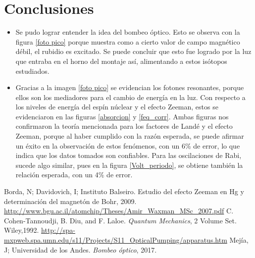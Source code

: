 \documentclass[%
 reprint,
 amsmath,amssymb,
 aps,
]{revtex4-1}
\begin{document}
\section{Conclusiones}
\begin{itemize}
    \item Se pudo lograr entender la idea del bombeo óptico. Esto se observa con la figura \ref{foto pico} porque muestra como a cierto valor de campo magnético débil, el rubidio es excitado. Se puede concluir que esto fue logrado por la luz que entraba en el horno del montaje así, alimentando a estos isótopos estudiados.
    \item Gracias a la imagen \ref{foto pico} se evidencian los fotones resonantes, porque ellos son los mediadores para el cambio de energía en la luz. Con respecto a los niveles de energía del espín núclear y el efecto Zeeman, estos se evidenciaron en las figuras \ref{absorcion} y \ref{feq_corr}. Ambas figuras nos confirmaron la teoría mencionada para los factores de Landé y el efecto Zeeman, porque al haber cumplido con la razón esperada, se puede afirmar un éxito en la observación de estos fenómenos, con un 6\% de error, lo que indica que los datos tomados son confiables. Para las oscilaciones de Rabi, sucede algo similar, pues en la figura \ref{Volt_periodo}, se obtiene también la relación esperada, con un 4\% de error.
\end{itemize}

\begin{thebibliography}{9}
Borda, N; Davidovich, I; Instituto Balseiro. Estudio del efecto Zeeman en Hg y determinación del magnetón de Bohr, 2009.
\url{http://www.bgu.ac.il/atomchip/Theses/Amir_Waxman_MSc_2007.pdf}
C. Cohen-Tannoudji, B. Diu, and F. Laloe. \textit{Quantum Mechanics}, 2 Volume Set. Wiley,1992.
\url{http://spa-mxpweb.spa.umn.edu/s11/Projects/S11_OpticalPumping/apparatus.htm}
Mejía, J; Universidad de los Andes. \textit{Bombeo óptico}, 2017.

\end{thebibliography}
\end{document}
